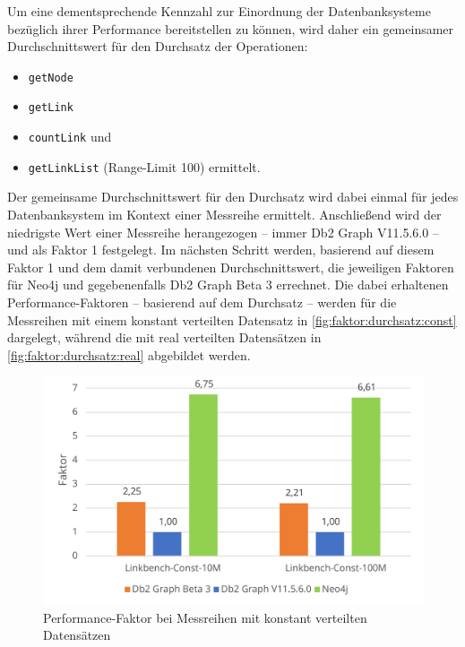 Um eine dementsprechende Kennzahl zur Einordnung der Datenbanksysteme bezüglich ihrer Performance bereitstellen zu können, wird daher ein gemeinsamer Durchschnittswert für den Durchsatz der Operationen:
\begin{itemize}
    \item \texttt{getNode}
    \item \texttt{getLink}
    \item \texttt{countLink} und 
    \item \texttt{getLinkList} (Range-Limit 100) ermittelt.
\end{itemize}
Der gemeinsame Durchschnittswert für den Durchsatz wird dabei einmal für jedes Datenbanksystem im Kontext einer Messreihe ermittelt. Anschließend wird der niedrigste Wert einer Messreihe herangezogen -- immer Db2 Graph V11.5.6.0 -- und als Faktor 1 festgelegt. Im nächsten Schritt werden, basierend auf diesem Faktor 1 und dem damit verbundenen Durchschnittswert, die jeweiligen Faktoren für Neo4j und gegebenenfalls Db2 Graph Beta 3 errechnet. Die dabei erhaltenen Performance-Faktoren -- basierend auf dem Durchsatz -- werden für die Messreihen mit einem konstant verteilten Datensatz in \autoref{fig:faktor:durchsatz:const} dargelegt, während die mit real verteilten Datensätzen in \autoref{fig:faktor:durchsatz:real} abgebildet werden.

\begin{figure}[!ht]
    \centering
    \includegraphics[width=\textwidth]{images/diagramme/faktor_durchschittlicher_durchsatz_const.pdf}
    \caption{Performance-Faktor bei Messreihen mit konstant verteilten Datensätzen}
    \label{fig:faktor:durchsatz:const}
\end{figure}

